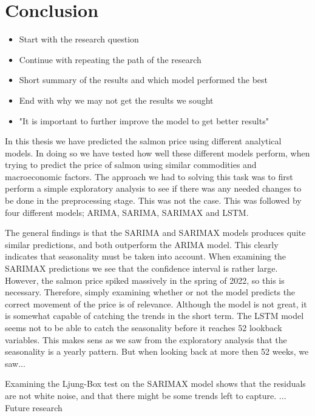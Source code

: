 \section{Conclusion}
\begin{itemize}
    \item Start with the research question
    \item Continue with repeating the path of the research
    \item Short summary of the results and which model performed the best
    \item End with why we may not get the results we sought
    \item "It is important to further improve the model to get better results"
\end{itemize}

In this thesis we have predicted the salmon price using different analytical models. In doing so we have tested how well these different models perform, when trying to predict the price of salmon using similar commodities and macroeconomic factors. The approach we had to solving this task was to first perform a simple exploratory analysis to see if there was any needed changes to be done in the preprocessing stage. This was not the case. This was followed by four different models; ARIMA, SARIMA, SARIMAX and LSTM. 

The general findings is that the SARIMA and SARIMAX models produces quite similar predictions, and both outperform the ARIMA model. This clearly indicates that seasonality must be taken into account. When examining the SARIMAX predictions we see that the confidence interval is rather large. However, the salmon price spiked massively in the spring of 2022, so this is necessary. Therefore, simply examining whether or not the model predicts the correct movement of the price is of relevance. Although the model is not great, it is somewhat capable of catching the trends in the short term. The LSTM model seems not to be able to catch the seasonality before it reaches 52 lookback variables. This makes sens as we saw from the exploratory analysis that the seasonality is a yearly pattern. But when looking back at more then 52 weeks, we saw...

Examining the Ljung-Box test on the SARIMAX model shows that the residuals are not white noise, and that there might be some trends left to capture. ... Future research

